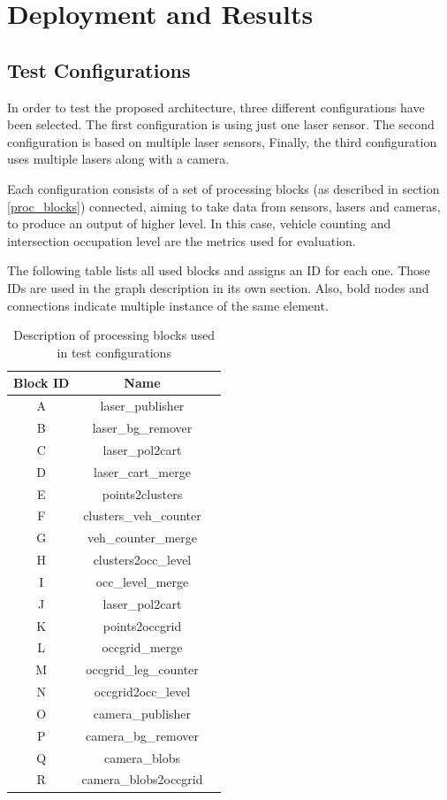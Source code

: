 \chapter [Deployment and Results]{Deployment and Results}

\section{Test Configurations}
In order to test the proposed architecture, three different configurations have been selected. The first configuration is using just one laser sensor. The second configuration is based on multiple laser sensors, Finally, the third configuration uses multiple lasers along with a camera.

Each configuration consists of a set of processing blocks (as described in section \ref{proc_blocks}) connected, aiming to take data from sensors, lasers and cameras, to produce an output of higher level. In this case, vehicle counting and intersection occupation level are the metrics used for evaluation.

The following table lists all used blocks and assigns an ID for each one. Those IDs are used in the graph description in its own section. Also, bold nodes and connections indicate multiple instance of the same element.

\begin{table}[ht!]
\footnotesize
\centering
\begin{tabular}{|c | c| c|}
\hline
\textbf{Block ID} & \textbf{Name} \\
\hline
A & laser\_publisher \\
\hline
B & laser\_bg\_remover \\
\hline
C & laser\_pol2cart \\
\hline
D & laser\_cart\_merge \\
\hline
E & points2clusters \\
\hline
F & clusters\_veh\_counter \\
\hline
G & veh\_counter\_merge \\
\hline
H & clusters2occ\_level \\
\hline
I & occ\_level\_merge \\
\hline
J & laser\_pol2cart \\
\hline
K & points2occgrid \\
\hline
L & occgrid\_merge \\
\hline
M & occgrid\_leg\_counter \\
\hline
N & occgrid2occ\_level \\
\hline
O & camera\_publisher \\
\hline
P & camera\_bg\_remover \\
\hline
Q & camera\_blobs \\
\hline
R & camera\_blobs2occgrid \\
\hline
\end{tabular}
\caption{Description of processing blocks used in test configurations}
\label{desc_test_config}
\end{table}


